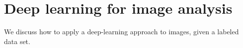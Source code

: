 \section{Deep learning for image analysis}
\label{sec:cnn}


We discuss how to apply a deep-learning approach to images, given a labeled data set.